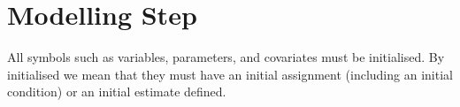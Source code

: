 


\section{Modelling Step}

\begin{valrules}
 All symbols such as variables,
parameters, and covariates must be initialised. By initialised we mean
that they must have an initial assignment (including an initial
condition) or an initial estimate defined.
\end{valrules}




